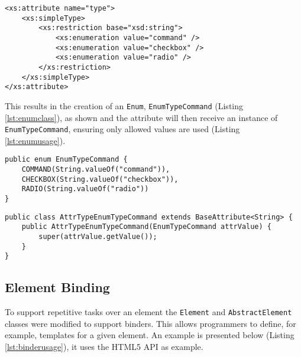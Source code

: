 \begin{minipage}{\linewidth}
\begin{lstlisting}[caption={Enumeration XSD Definition},captionpos=b,label={lst:enumxsddefinition}]
<xs:attribute name="type">
    <xs:simpleType>
        <xs:restriction base="xsd:string">
            <xs:enumeration value="command" />
            <xs:enumeration value="checkbox" />
            <xs:enumeration value="radio" />
        </xs:restriction>
    </xs:simpleType>
</xs:attribute>
\end{lstlisting}
\end{minipage}

\newpage

\noindent
This results in the creation of an \texttt{Enum}, \texttt{EnumTypeCommand} (Listing \ref{lst:enumclass}), as shown and the attribute will then receive an instance of \texttt{EnumTypeCommand}, ensuring only allowed values are used (Listing \ref{lst:enumusage}).

\bigskip


\begin{minipage}{\linewidth}
\begin{lstlisting}[caption={Enumeration Class},captionpos=b,label={lst:enumclass}]
public enum EnumTypeCommand {
    COMMAND(String.valueOf("command")), 
    CHECKBOX(String.valueOf("checkbox")),
    RADIO(String.valueOf("radio"))
}
\end{lstlisting}
\end{minipage}


\begin{minipage}{\linewidth}
\begin{lstlisting}[caption={Attribute Receiving An Enumeration},captionpos=b,label={lst:enumusage}]
public class AttrTypeEnumTypeCommand extends BaseAttribute<String> {
    public AttrTypeEnumTypeCommand(EnumTypeCommand attrValue) {
        super(attrValue.getValue());
    }
}
\end{lstlisting}
\end{minipage}

\subsection{Element Binding}
\label{sec:elementbinding}

\noindent
To support repetitive tasks over an element the \texttt{Element} and \texttt{AbstractElement} classes were modified to support binders. This allows programmers to define, for example, templates for a given element. An example is presented below (Listing \ref{lst:binderusage}), it uses the \ac{HTML}5 \ac{API} as example.

